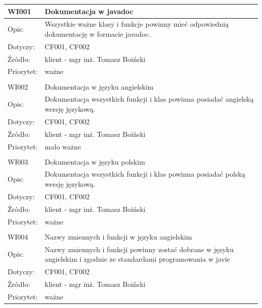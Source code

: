 \documentclass[a4paper,10pt]{article}
\begin{document}
\begin{center}

\begin{tabular}{|m{3cm}|m{9cm}|} \hline

WI001 & Dokumentacja w javadoc \\ \hline
Opis: & Wszystkie ważne klasy i funkcje powinny mieć odpowiednią dokumentację w formacie javadoc.\\ \hline
Dotyczy: & CF001, CF002 \\ \hline
Źródło: & klient - mgr inż. Tomasz Boiński \\ \hline
Priorytet: & ważne \\ \hline

\multicolumn{2}{c}{} \\
 \hline

WI002 & Dokumentacja w języku angielskim \\ \hline
Opis: & Dokumentacja wszystkich funkcji i klas powinna posiadać angielską wersję językową.\\ \hline
Dotyczy: & CF001, CF002 \\ \hline
Źródło: & klient - mgr inż. Tomasz Boiński \\ \hline
Priorytet: & mało ważne \\ \hline

\multicolumn{2}{c}{} \\
 \hline

WI003 & Dokumentacja w języku polskim \\ \hline
Opis: & Dokumentacja wszystkich funkcji i klas powinna posiadać polską wersję językową. \\ \hline
Dotyczy: & CF001, CF002 \\ \hline
Źródło: & klient - mgr inż. Tomasz Boiński \\ \hline
Priorytet: & ważne \\ \hline

\multicolumn{2}{c}{} \\
 \hline
WI004 & Nazwy zmiennych i funkcji w języku angielskim \\ \hline
Opis: & Nazwy zmiennych i funkcji powinny zostać dobrane w języku angielskim i zgodnie ze standardami programowania w javie %
\\ \hline
Dotyczy: & CF001, CF002 \\ \hline
Źródło: & klient - mgr inż. Tomasz Boiński \\ \hline
Priorytet: & ważne \\ \hline

\end{tabular}

\end{center}
\end{document}
